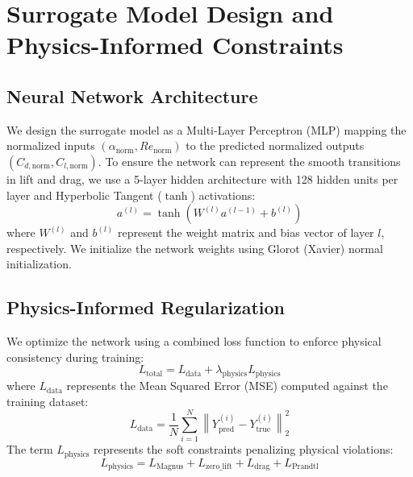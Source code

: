 \documentclass[aip,pof,reprint,onecolumn,amsmath,amssymb,graphicx,longbibliography]{revtex4-2}
\begin{document}
\section{\label{sec:pinn_methodology}Surrogate Model Design and Physics-Informed Constraints}

\subsection{\label{subsec:model_architecture}Neural Network Architecture}
We design the surrogate model as a Multi-Layer Perceptron (MLP) mapping the normalized inputs $(\alpha_{\text{norm}}, Re_{\text{norm}})$ to the predicted normalized outputs $(C_{d,\text{norm}}, C_{l,\text{norm}})$. To ensure the network can represent the smooth transitions in lift and drag, we use a 5-layer hidden architecture with 128 hidden units per layer and Hyperbolic Tangent ($\tanh$) activations:
\begin{equation}
a^{(l)} = \tanh(W^{(l)} a^{(l-1)} + b^{(l)})
\end{equation}
where $W^{(l)}$ and $b^{(l)}$ represent the weight matrix and bias vector of layer $l$, respectively. We initialize the network weights using Glorot (Xavier) normal initialization.

\subsection{\label{subsec:pinn_loss}Physics-Informed Regularization}
We optimize the network using a combined loss function to enforce physical consistency during training:
\begin{equation}
L_{\text{total}} = L_{\text{data}} + \lambda_{\text{physics}} L_{\text{physics}}
\end{equation}
where $L_{\text{data}}$ represents the Mean Squared Error (MSE) computed against the training dataset:
\begin{equation}
L_{\text{data}} = \frac{1}{N} \sum_{i=1}^{N} \left\| Y_{\text{pred}}^{(i)} - Y_{\text{true}}^{(i)} \right\|_2^2
\end{equation}
The term $L_{\text{physics}}$ represents the soft constraints penalizing physical violations:
\begin{equation}
L_{\text{physics}} = L_{\text{Magnus}} + L_{\text{zero\_lift}} + L_{\text{drag}} + L_{\text{Prandtl}}
\end{equation}
\end{document}
